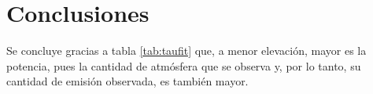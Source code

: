 \section{Conclusiones}

Se concluye gracias a tabla \ref{tab:taufit} que, a menor elevación, mayor es la potencia, pues la cantidad de atmósfera que se observa y, por lo tanto, su cantidad de emisión observada, es también mayor. 